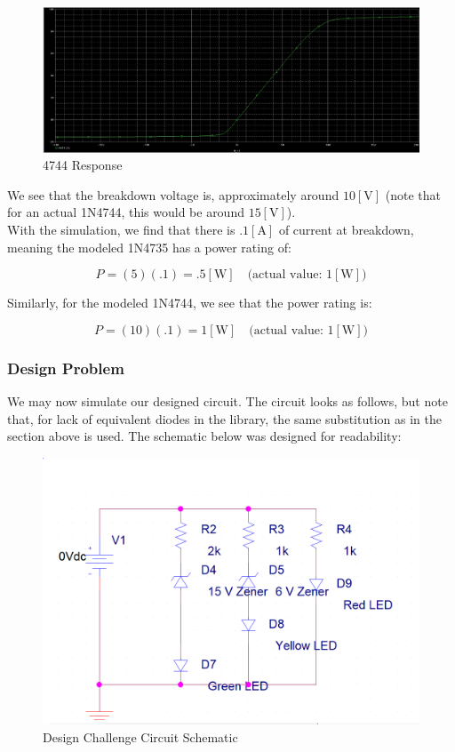 \documentclass[
	letterpaper, %
	10pt, %
]{CSUniSchoolLabReport}
\begin{document}
  \begin{figure}[H]
    \centering
    \includegraphics[width=.9\textwidth]{Figures/L2F14}
    \caption{4744 Response}
    \label{fig:15}
  \end{figure}

  We see that the breakdown voltage is, approximately around $10[\si{\volt}]$ (note that for an actual 1N4744, this would be around $15[\si{\volt}]$).\\
  
  With the simulation, we find that there is $.1[\si{\ampere}]$ of current at breakdown, meaning the modeled 1N4735 has a power rating of:

  $$P=(5)(.1)=.5[\si{\watt}]\quad\text{(actual value: $1[\si{\watt}]$)}$$

  Similarly, for the modeled 1N4744, we see that the power rating is:

  $$P=(10)(.1)=1[\si{\watt}]\quad\text{(actual value: $1[\si{\watt}]$)}$$

  \subsubsection{Design Problem}
  
  We may now simulate our designed circuit. The circuit looks as follows, but note that, for lack of equivalent diodes in the library, the same substitution as in the section above is used. The schematic below was designed for readability:

  \begin{figure}[H]
    \centering
    \includegraphics[width=.9\textwidth]{Figures/L2F15}
    \caption{Design Challenge Circuit Schematic}
    \label{fig:16}
  \end{figure}
\end{document}

